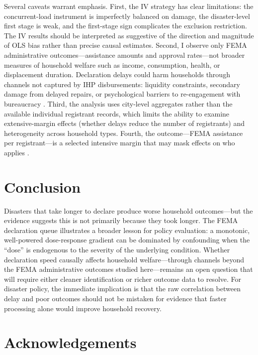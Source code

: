 \documentclass[12pt]{article}
\begin{document}
Several caveats warrant emphasis. First, the IV strategy has clear limitations: the concurrent-load instrument is imperfectly balanced on damage, the disaster-level first stage is weak, and the first-stage sign complicates the exclusion restriction. The IV results should be interpreted as suggestive of the direction and magnitude of OLS bias rather than precise causal estimates. Second, I observe only FEMA administrative outcomes---assistance amounts and approval rates---not broader measures of household welfare such as income, consumption, health, or displacement duration. Declaration delays could harm households through channels not captured by IHP disbursements: liquidity constraints, secondary damage from delayed repairs, or psychological barriers to re-engagement with bureaucracy \citep{deryugina2018fiscal}. Third, the analysis uses city-level aggregates rather than the available individual registrant records, which limits the ability to examine extensive-margin effects (whether delays reduce the number of registrants) and heterogeneity across household types. Fourth, the outcome---FEMA assistance per registrant---is a selected intensive margin that may mask effects on who applies \citep{billings2022, boustan2020}.


\section{Conclusion}

Disasters that take longer to declare produce worse household outcomes---but the evidence suggests this is not primarily because they took longer. The FEMA declaration queue illustrates a broader lesson for policy evaluation: a monotonic, well-powered dose-response gradient can be dominated by confounding when the ``dose'' is endogenous to the severity of the underlying condition. Whether declaration speed causally affects household welfare---through channels beyond the FEMA administrative outcomes studied here---remains an open question that will require either cleaner identification or richer outcome data to resolve. For disaster policy, the immediate implication is that the raw correlation between delay and poor outcomes should not be mistaken for evidence that faster processing alone would improve household recovery.

\section*{Acknowledgements}
\end{document}

